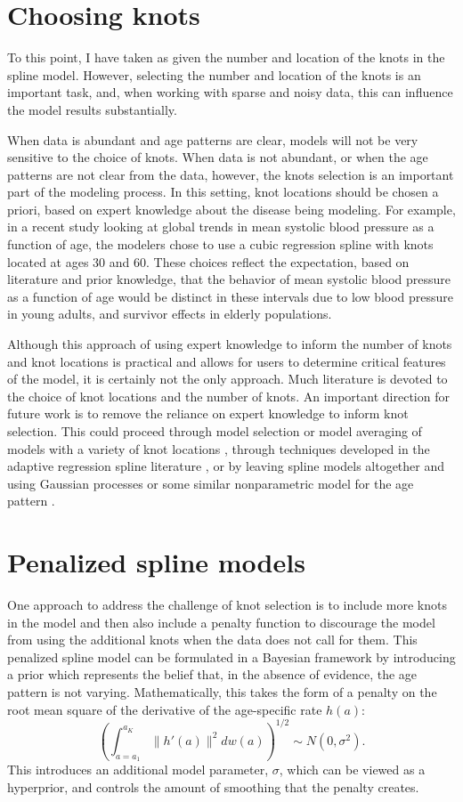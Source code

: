 \section{Choosing knots}

To this point, I have taken as given the number and location of the
knots in the spline model. However, selecting the number and location
of the knots is an important task, and, when working with sparse and
noisy data, this can influence the model results
substantially.

When data is abundant and age patterns are clear, models will not be
very sensitive to the choice of knots.  When data is not abundant, or
when the age patterns are not clear from the data, however, the knots
selection is an important part of the modeling process.  In this
setting, knot locations should be chosen a priori, based on expert
knowledge about the disease being modeling. For example, in a recent
study looking at global trends in mean systolic blood pressure as a
function of age, the modelers chose to use a cubic regression spline
with knots located at ages 30 and 60.\cite{Danaei_National_2011} These
choices reflect the expectation, based on literature and prior
knowledge, that the behavior of mean systolic blood pressure as a
function of age would be distinct in these intervals due to low blood
pressure in young adults, and survivor effects in elderly populations.

Although this approach of using expert knowledge to inform the number
of knots and knot locations is practical and allows for users to
determine critical features of the model, it is certainly not the only
approach. Much literature is devoted to the choice of knot locations
and the number of knots.
An important direction for future work is to remove the reliance on
expert knowledge to inform knot selection.  This could proceed
through model selection or model averaging of models with a variety of
knot locations \cite{[ref baysian model averaging[KP3]]}, through
techniques developed in the adaptive regression spline literature
\cite{[ref[KP4]]}, or by leaving spline models altogether and using Gaussian
processes or some similar nonparametric model for the age pattern
\cite{[ref GP[KP5]]}.

\section{Penalized spline models}
One approach to address the challenge of knot selection is to include
more knots in the model and then also include a penalty function to
discourage the model from using the additional knots when the data
does not call for them.  This penalized spline model can be formulated in a
Bayesian framework by introducing a prior which represents the belief that, in
the absence of evidence, the age pattern is not varying.
Mathematically, this takes the form of a penalty on the root mean
square of the derivative of the age-specific rate $h(a)$:
\[
\left(\int _{a=a_1} ^{a_K} \| h'(a) \|^2 dw(a)\right)^{1/2} \sim N(0, \sigma^2).
\]
This introduces an additional model parameter, $\sigma$, which can be
viewed as a hyperprior, and controls the amount of smoothing that the
penalty creates.


